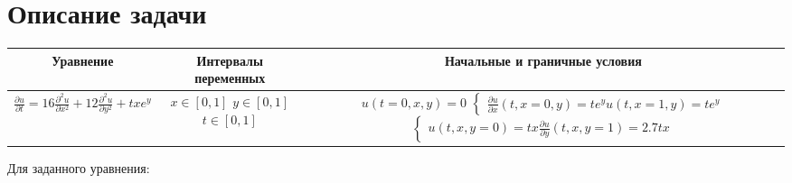 \documentclass[12pt, a4paper]{report}
\begin{document}
	\section*{Описание задачи}
	\large
	\begin{center}
		\begin{tabular}{||c|c|c||}
			\hline
			Уравнение & \makecell{Интервалы \\ переменных} & Начальные и граничные условия \\

			\hline
			$ \frac{\partial u}{\partial t} = 16\frac{\partial^{2} u}{\partial x^{2}} + 12\frac{\partial^{2} u}{\partial y^{2}} + txe^{y} $ & \makecell{$ x \in [0, 1] $ \\ $ y \in [0, 1] $ \\ $ t \in [0, 1] $} & \makecell{$ u(t = 0, x, y) = 0 $ \\ $\begin{cases} \frac{\partial u}{\partial x}(t, x = 0, y) = te^{y} \\ u(t, x = 1, y) = te^{y} \end{cases}$ \\ $\begin{cases} u(t, x, y = 0) = tx \\ \frac{\partial u}{\partial y}(t, x, y = 1) = 2.7tx \end{cases}$} \\

			\hline
		\end{tabular}
	\end{center}
	\par
	Для заданного уравнения:
\end{document}
